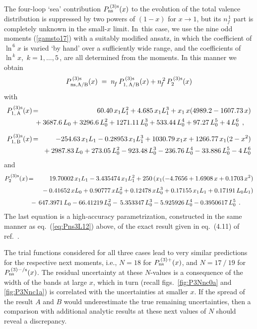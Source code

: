 \documentclass[12pt]{article}
\newcommand{\beq}{\begin{equation}}
\newcommand{\eeq}{\end{equation}}
\newcommand{\bea}{\begin{eqnarray}}
\newcommand{\eea}{\end{eqnarray}}
\newcommand{\ra}{\rightarrow}
\newcommand{\hspn}{{\hspace{-5mm}}}
\def\nf{{n^{}_{\! f}}}
\def\nfo{{n^{\,1}_{\! f}}}
\def\nfs{{n^{\,2}_{\! f}}}
\def\xm1{{(1 \! - \! x)}}
\begin{document}
The four-loop `sea' contribution $P_{\rm ns}^{\,(3)\rm s}(x)$ to the evolution 
of the total valence distribution is suppressed by two powers of $\xm1$ for 
$x \ra 1$, but its $\nfo$ part is completely unknown in the \mbox{small-$x$} 
limit.
In~this case, we use the nine odd moments (\ref{gamsto17}) with a suitably 
modified ansatz, in which the coefficient of $\ln^{\,6}x$ is varied `by hand' 
over a sufficiently wide range, and the coefficients of $\ln^{\,k}x$, 
$\,k=1,\ldots,5\,$, are all determined from the moments. 
In this manner we obtain
%
\beq
  P_{\rm ns, A/B}^{\,(3)\rm s}(x) \;=\; 
  \nf\, P_{1,\,\rm A/B}^{\,(3)\rm s}(x) + \nfs \, P_{2}^{\,(3)\rm s}(x)
\eeq
%
with
%
\bea
\label{eq:Pqq3s-A}
   P_{1,\,\rm A}^{\,(3)\rm s}(x) & \!=\! &
%
       60.40 \,\* x_1 \* L_1^2 + 4.685 \,\* x_1 \* L_1^3
       + x_1 \,\* x \*  ( 4989.2 - 1607.73 \,\*  x)
\nonumber \\ && \mbox{\hspn}
       + 3687.6 \,\*  L_0 + 3296.6 \,\*  L_0^2 + 1271.11 \,\*  L_0^3
       + 533.44  \,\*  L_0^4 + 97.27 \,\*   L_0^5 + 4 \,\*  L_0^6
\:\: , \quad \\[2mm]
%
\label{eq:Pqq3s-B}
   P_{1,\,\rm B}^{\,(3)\rm s}(x) & \!=\! &
%
       - 254.63 \,\*  x_1 \* L_1 - 0.28953 \,\* x_1 \* L_1^3
       + 1030.79 \,\*  x_1 \* x + 1266.77 \,\* x_1 \* (2-x^2) 
\nonumber \\ && \mbox{\hspn}
       + 2987.83  \,\*  L_0 + 273.05 \,\*  L_0^2 - 923.48 \,\*  L_0^3 
       - 236.76 \,\*  L_0^4 - 33.886 \,\*   L_0^5 - 4 \,\*  L_0^6 
\eea
%
and
%
\bea
\label{eq:Pqq3s2}
   P_{2}^{\,(3)\rm s}(x) & \!=\! &
%
     19.70002 \,\* x_1 \* L_1 - 3.435474 \,\* x_1 \* L_1^2  
   + 250 \,\* ( x_1 \*  ( -4.7656 + 1.6908 \,\*  x + 0.1703 \,\* x^2 ) 
\nonumber \\[1mm] && \mbox{\hspn}
   - 0.41652 \,\* x \* L_0 + 0.90777 \,\* x \* L_0^2 
   + 0.12478 \,\* x \* L_0^3 
   + 0.17155 \,\*  x_1 \* L_1 + 0.17191  \,\*  L_0 \* L_1 )
\nonumber \\[1mm] && \mbox{\hspn}
     -\, 647.3971 \,\* L_0 - 66.41219 \,\* L_0^2 
     -\, 5.353347 \,\* L_0^3 - 5.925926 \,\* L_0^4 - 0.3950617\, \* L_0^5
\:\: . \qquad
\eea
%
The last equation is a high-accuracy parametrization, constructed in the
same manner as eq.~(\ref{eq:Pns3L12}) above, of the exact result given in 
eq.~(4.11) of ref.~\cite{Davies:2016jie}.

\bigskip

The trial functions considered for all three cases lead to very similar 
predictions for the respective next moments, i.e., $N=18$ for 
$P_{\rm ns}^{\,(3)+}(x)$, and $N=17\:/\:19$ for $P_{\rm ns}^{\,(3)-/\rm s}(x)$.
The residual uncertainty at these $N$-values is a consequence of the width of 
the bands at large $x$, which in turn (recall figs.~\ref{fig:P3Nnc0a} and 
\ref{fig:P3Nnc1a}) is correlated with the uncertainties at smaller $x$. 
If the spread of the result $A$ and $B$ would underestimate the true remaining
uncertainties, then a comparison with additional analytic results at these
next values of $N$ should reveal a discrepancy.
\end{document}
